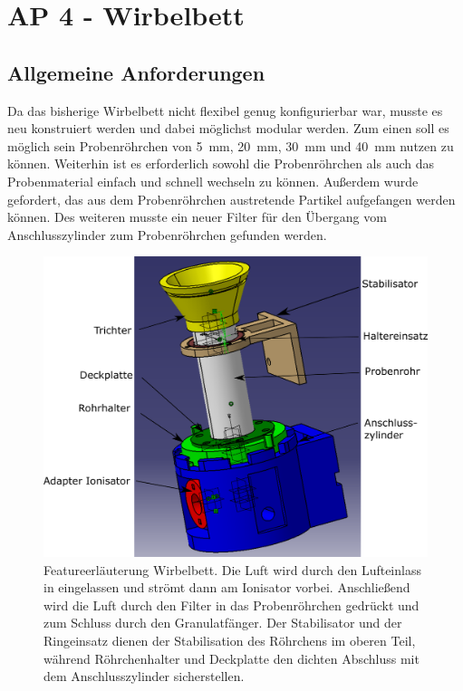 \newpage


\section{AP 4 - Wirbelbett}


\subsection{Allgemeine Anforderungen}

Da das bisherige Wirbelbett nicht flexibel genug konfigurierbar war, musste es neu konstruiert werden und dabei möglichst modular werden. Zum einen soll es möglich sein Probenröhrchen von \SI{5}{mm}, \SI{20}{mm}, \SI{30}{mm} und \SI{40}{mm} nutzen zu können. Weiterhin ist es erforderlich sowohl die Probenröhrchen als auch das Probenmaterial einfach und schnell wechseln zu können. Außerdem wurde gefordert, das aus dem Probenröhrchen austretende Partikel aufgefangen werden können. Des weiteren musste ein neuer Filter für den Übergang vom Anschlusszylinder zum Probenröhrchen gefunden werden. 


\begin{figure}[h!]
	\begin{center}
		\includegraphics[scale=0.45]{Zusammenbau_fluides_Bett.png}
		\caption[Modell Wirbelbett]{Featureerläuterung Wirbelbett. Die Luft wird durch den Lufteinlass in eingelassen und strömt dann am Ionisator vorbei. Anschließend wird die Luft durch den Filter in das Probenröhrchen gedrückt und zum Schluss durch den Granulatfänger. Der Stabilisator und der Ringeinsatz dienen der Stabilisation des Röhrchens im oberen Teil, während Röhrchenhalter und Deckplatte den dichten Abschluss mit dem Anschlusszylinder sicherstellen.}
	\end{center}
\end{figure}

